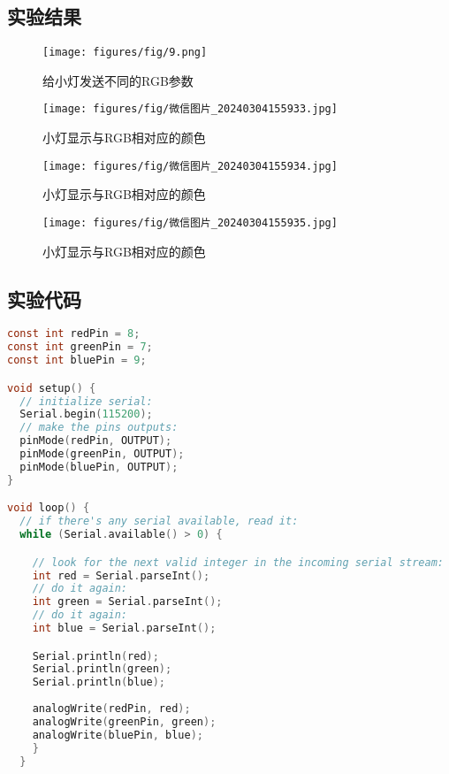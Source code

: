 \documentclass[12pt,hyperref,a4paper,UTF8]{ctexart}
\begin{document}
\subsection{实验结果}
    \begin{figure}[H]
        \centering
        \texttt{[image: figures/fig/9.png]}
        \caption{给小灯发送不同的RGB参数}
        \label{fig:enter-label}
    \end{figure}


    \begin{figure}[H]
        \centering
        \texttt{[image: figures/fig/微信图片\_20240304155933.jpg]}
        \caption{小灯显示与RGB相对应的颜色}
        \label{fig:enter-label}
    \end{figure}
    \begin{figure}[H]
        \centering
        \texttt{[image: figures/fig/微信图片\_20240304155934.jpg]}
        \caption{小灯显示与RGB相对应的颜色}
        \label{fig:enter-label}
    \end{figure}
    \begin{figure}[H]
        \centering
        \texttt{[image: figures/fig/微信图片\_20240304155935.jpg]}
        \caption{小灯显示与RGB相对应的颜色}
        \label{fig:enter-label}
    \end{figure}



\subsection{实验代码}
\begin{lstlisting}[language={C}]
const int redPin = 8;
const int greenPin = 7;
const int bluePin = 9;

void setup() {
  // initialize serial:
  Serial.begin(115200);
  // make the pins outputs:
  pinMode(redPin, OUTPUT);
  pinMode(greenPin, OUTPUT);
  pinMode(bluePin, OUTPUT);
}

void loop() {
  // if there's any serial available, read it:
  while (Serial.available() > 0) {

    // look for the next valid integer in the incoming serial stream:
    int red = Serial.parseInt();
    // do it again:
    int green = Serial.parseInt();
    // do it again:
    int blue = Serial.parseInt();

    Serial.println(red);
    Serial.println(green);
    Serial.println(blue);
    
    analogWrite(redPin, red);
    analogWrite(greenPin, green);
    analogWrite(bluePin, blue);
    }
  }
\end{lstlisting}


\end{document}

